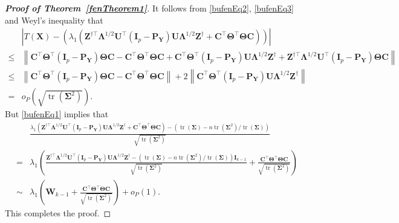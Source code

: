 \documentclass[12pt]{article} %
\DeclareMathOperator{\mytr}{tr}
\newcommand{\bZ}{\mathbf{Z}}
\newcommand{\bX}{\mathbf{X}}
\newcommand{\bP}{\mathbf{P}}
\newcommand{\bY}{\mathbf{Y}}
\newcommand{\bC}{\mathbf{C}}
\newcommand{\bI}{\mathbf{I}}
\newcommand{\bU}{\mathbf{U}}
\newcommand{\bW}{\mathbf{W}}
\newcommand{\bfsym}[1]{\ensuremath{\boldsymbol{#1}}}
\def\bLambda {\bfsym {\Lambda}}
\def\bSigma {\bfsym {\Sigma}}
\def\bTheta {\bfsym {\Theta}}
\theoremstyle{definition}
\begin{document}
\begin{appendices}
\begin{proof}[\textbf{Proof of Theorem~\ref{fenTheorem1}}]
It follows from \eqref{bufenEq2}, \eqref{bufenEq3} and Weyl's inequality that
\begin{equation*}
    \begin{split}
        &\left|
        T(\bX)-
        \left(
        \lambda_1\left(
\bZ^{\dagger \top} \bLambda^{1/2}\bU^\top (\bI_p-\bP_{\bY})\bU\bLambda^{1/2}\bZ^{\dagger}+
 \bC^\top \bTheta^\top \bTheta \bC
        \right)
    \right)
        \right|
        \\
        \leq
        &
 \left\|
 \bC^\top \bTheta^\top (\bI_p -\bP_{\bY})\bTheta \bC
 -
 \bC^\top \bTheta^\top \bTheta \bC
 +
  \bC^\top \bTheta^\top (\bI_p -\bP_{\bY})\bU\bLambda^{1/2}\bZ^{\dagger}+
 \bZ^{\dagger \top} \bLambda^{1/2}\bU^\top (\bI_p-\bP_{\bY})\bTheta \bC
 \right\|
 \\
 \leq&
 \left\|
 \bC^\top \bTheta^\top (\bI_p -\bP_{\bY})\bTheta \bC
 -
 \bC^\top \bTheta^\top \bTheta \bC
 \right\|
 +
 2\left\|
  \bC^\top \bTheta^\top (\bI_p -\bP_{\bY})\bU\bLambda^{1/2}\bZ^{\dagger}
 \right\|
 \\
=&o_P\left(
\sqrt{\mytr(\bSigma^2)}
\right)
 .
    \end{split}
\end{equation*}
But \eqref{bufenEq1} implies that
\begin{equation*}
    \begin{split}
&\frac{
        \lambda_1\left(
\bZ^{\dagger \top} \bLambda^{1/2}\bU^\top (\bI_p-\bP_{\bY})\bU\bLambda^{1/2}\bZ^{\dagger}+
 \bC^\top \bTheta^\top \bTheta \bC
 \right)
 -\left(\mytr(\bSigma)-{n\mytr(\bSigma^2)}/{\mytr(\bSigma)}\right)
 }{
     \sqrt{\mytr(\bSigma^2)}
 }
 \\
    =&
    \lambda_1\left(
    \frac{
     \bZ^{\dagger\top} \bLambda^{1/2} \bU^\top (\bI_p-\bP_{\bY})\bU\bLambda^{1/2}\bZ^{\dagger}
 -\left(\mytr(\bSigma)-{n\mytr(\bSigma^2)}/{\mytr(\bSigma)}\right)\bI_{k-1} 
 }{
     \sqrt{\mytr(\bSigma^2)}
 }
 +
 \frac{\bC^\top \bTheta^\top \bTheta \bC}{
     \sqrt{\mytr(\bSigma^2)}
 }
 \right)
 \\
 \sim& \lambda_1\left(\bW_{k-1}+
 \frac{\bC^\top \bTheta^\top \bTheta \bC}{
     \sqrt{\mytr(\bSigma^2)}
 }
 \right)+o_P(1).
    \end{split}
\end{equation*}
This completes the proof.


\end{proof}
\end{appendices}
\end{document}
